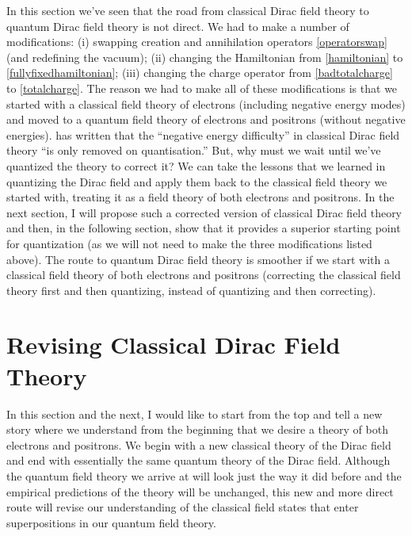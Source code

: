 \documentclass[12pt,secnumarabic,amsmath,amssymb,balancelastpage,nofootinbib]{article}
\begin{document}
In this section we've seen that the road from classical Dirac field theory to quantum Dirac field theory is not direct.  We had to make a number of modifications: (i) swapping creation and annihilation operators \eqref{operatorswap} (and redefining the vacuum); (ii) changing the Hamiltonian from \eqref{hamiltonian} to \eqref{fullyfixedhamiltonian}; (iii) changing the charge operator from \eqref{badtotalcharge} to \eqref{totalcharge}.  The reason we had to make all of these modifications is that we started with a classical field theory of electrons (including negative energy modes) and moved to a quantum field theory of electrons and positrons (without negative energies).  \citet[pg.\ 138]{ryder} has written that the ``negative energy difficulty'' in classical Dirac field theory ``is only removed on quantisation.''  But, why must we wait until we've quantized the theory to correct it?  We can take the lessons that we learned in quantizing the Dirac field and apply them back to the classical field theory we started with, treating it as a field theory of both electrons and positrons.  In the next section, I will propose such a corrected version of classical Dirac field theory and then, in the following section, show that it provides a superior starting point for quantization (as we will not need to make the three modifications listed above).  The route to quantum Dirac field theory is smoother if we start with a classical field theory of both electrons and positrons (correcting the classical field theory first and then quantizing, instead of quantizing and then correcting).







\section{Revising Classical Dirac Field Theory}\label{revisingCDFT}

In this section and the next, I would like to start from the top and tell a new story where we understand from the beginning that we desire a theory of both electrons and positrons.  We begin with a new classical theory of the Dirac field and end with essentially the same quantum theory of the Dirac field.  Although the quantum field theory we arrive at will look just the way it did before and the empirical predictions of the theory will be unchanged, this new and more direct route will revise our understanding of the classical field states that enter superpositions in our quantum field theory.
\end{document}

